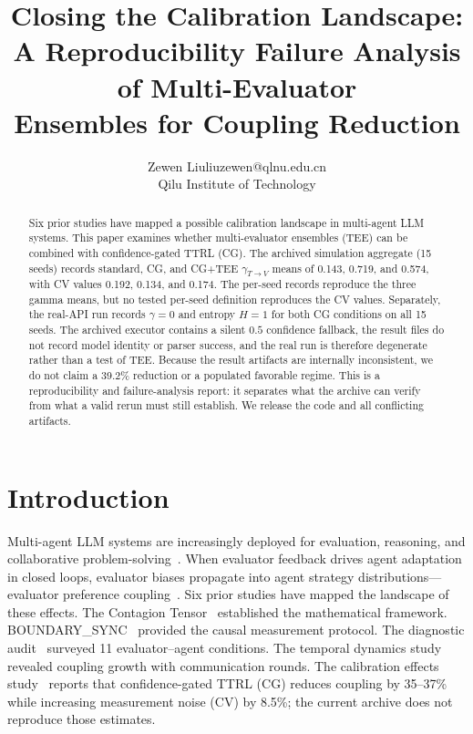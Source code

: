 \documentclass[11pt]{article}
\title{Closing the Calibration Landscape: \\ A Reproducibility Failure Analysis of Multi-Evaluator \\ Ensembles for Coupling Reduction}
\author{\name Zewen Liu\email liuzewen@qlnu.edu.cn\\\addr Qilu Institute of Technology}  %
\date{}
\begin{document}
\maketitle

\begin{abstract}
Six prior studies have mapped a possible calibration landscape in multi-agent LLM systems. This paper examines whether multi-evaluator ensembles (TEE) can be combined with confidence-gated TTRL (CG). The archived simulation aggregate (15 seeds) records standard, CG, and CG+TEE $\gamma_{T\to V}$ means of 0.143, 0.719, and 0.574, with CV values 0.192, 0.134, and 0.174. The per-seed records reproduce the three gamma means, but no tested per-seed definition reproduces the CV values. Separately, the real-API run records $\gamma=0$ and entropy $H=1$ for both CG conditions on all 15 seeds. The archived executor contains a silent $0.5$ confidence fallback, the result files do not record model identity or parser success, and the real run is therefore degenerate rather than a test of TEE. Because the result artifacts are internally inconsistent, we do not claim a 39.2\% reduction or a populated favorable regime. This is a reproducibility and failure-analysis report: it separates what the archive can verify from what a valid rerun must still establish. We release the code and all conflicting artifacts.
\end{abstract}

\newpage

\section{Introduction}

Multi-agent LLM systems are increasingly deployed for evaluation, reasoning, and collaborative problem-solving~\cite{zheng2023judging,chiang2024chatbot,li2023camel,wu2024autogen,snell2024scaling}. When evaluator feedback drives agent adaptation in closed loops, evaluator biases propagate into agent strategy distributions---evaluator preference coupling~\cite{liu2026epc}. Six prior studies have mapped the landscape of these effects. The Contagion Tensor~\cite{liu2026tensor} established the mathematical framework. BOUNDARY\_SYNC~\cite{liu2026boundarysync} provided the causal measurement protocol. The diagnostic audit~\cite{liu2026audit} surveyed 11 evaluator--agent conditions. The temporal dynamics study~\cite{liu2026temporal} revealed coupling growth with communication rounds. The calibration effects study~\cite{liu2026caleffects} reports that confidence-gated TTRL (CG) reduces coupling by 35--37\% while increasing measurement noise (CV) by 8.5\%; the current archive does not reproduce those estimates.
\end{document}
